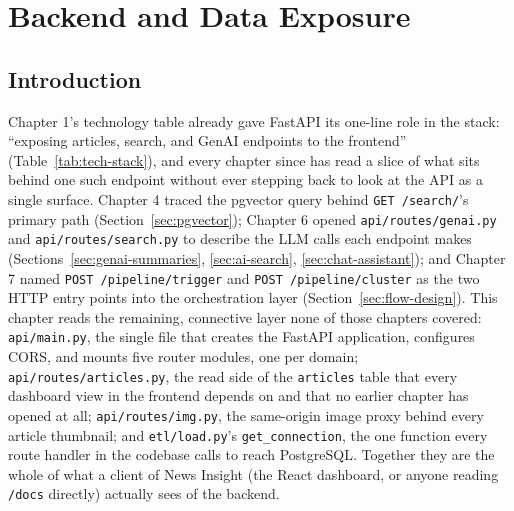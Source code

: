 \chapter{Backend and Data Exposure}

\section{Introduction}
\label{sec:backend-intro}
\begin{sloppypar}
Chapter 1's technology table already gave FastAPI its one-line role in the stack: ``exposing articles, search, and GenAI endpoints to the frontend'' (Table~\ref{tab:tech-stack}), and every chapter since has read a slice of what sits behind one such endpoint without ever stepping back to look at the API as a single surface. Chapter 4 traced the pgvector query behind \texttt{GET /search/}'s primary path (Section~\ref{sec:pgvector}); Chapter 6 opened \texttt{api/\allowbreak routes/\allowbreak genai.py} and \texttt{api/\allowbreak routes/\allowbreak search.py} to describe the LLM calls each endpoint makes (Sections~\ref{sec:genai-summaries}, \ref{sec:ai-search}, \ref{sec:chat-assistant}); and Chapter 7 named \texttt{POST /pipeline/trigger} and \texttt{POST /pipeline/cluster} as the two HTTP entry points into the orchestration layer (Section~\ref{sec:flow-design}). This chapter reads the remaining, connective layer none of those chapters covered: \texttt{api/\allowbreak main.py}, the single file that creates the FastAPI application, configures CORS, and mounts five router modules, one per domain; \texttt{api/\allowbreak routes/\allowbreak articles.py}, the read side of the \texttt{articles} table that every dashboard view in the frontend depends on and that no earlier chapter has opened at all; \texttt{api/\allowbreak routes/\allowbreak img.py}, the same-origin image proxy behind every article thumbnail; and \texttt{etl/\allowbreak load.py}'s \texttt{get\_connection}, the one function every route handler in the codebase calls to reach PostgreSQL. Together they are the whole of what a client of News Insight (the React dashboard, or anyone reading \texttt{/docs} directly) actually sees of the backend.
\end{sloppypar}

